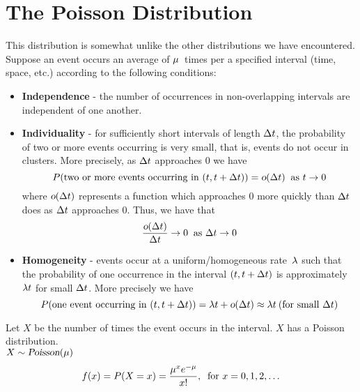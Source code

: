 \section{The Poisson Distribution}
This distribution is somewhat unlike the other distributions we have encountered. Suppose an event occurs an average of $\mu$~times per a specified interval (time, space, etc.) according to the following conditions:
\begin{itemize}
    \item \textbf{Independence} - the number of occurrences in non-overlapping intervals are independent of one another.
    \item \textbf{Individuality} - for sufficiently short intervals of length $\Delta t$, the probability of two or more events occurring is very small, that is, events do not occur in clusters. More precisely, as $\Delta t$ approaches 0 we have
    \[
        P(\text{two or more events occurring in $(t, t+\Delta t)$}) = \textsl{o}(\Delta t)\:\text{ as } t \rightarrow 0
    \]
    where $\textsl{o}(\Delta t)$ represents a function which approaches 0 more quickly than $\Delta t$ does as $\Delta t$ approaches 0. Thus, we have that
    \[
        \frac{\textsl{o}(\Delta t)}{\Delta t} \rightarrow 0\:\text{ as } \Delta t\rightarrow 0
    \]
    \item \textbf{Homogeneity} - events occur at a uniform/homogeneous rate~$\lambda$ such that the probability of one occurrence in the interval $(t, t+\Delta t)$ is approximately $\lambda t$ for small $\Delta t$. More precisely we have
    \[
        P(\text{one event occurring in $(t, t+\Delta t)$}) = \lambda t + \textsl{o}(\Delta t)
        \approx \lambda t \:\text{(for small $\Delta t$)}
    \]
\end{itemize}
Let $X$ be the number of times the event occurs in the interval. $X$ has a Poisson distribution. \\
$X \sim \operatorname{\textsl{Poisson}}(\mu)$
\[
    f(x) = P(X = x) = \frac{\mu^x e^{-\mu}}{x!},\:\text{ for } x = 0,1,2,\ldots
\]
